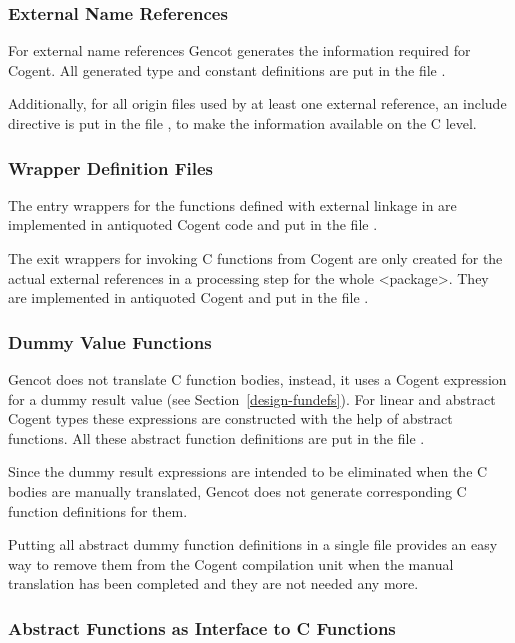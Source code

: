 \subsubsection{External Name References}

For external name references Gencot generates the information required for Cogent. 
All generated type and constant definitions are put in the file .

Additionally, for all origin files used by at least one external reference, an include directive is put in the file
, to make the information available on the C level.

\subsubsection{Wrapper Definition Files}

The entry wrappers for the functions defined with external linkage in  are implemented in antiquoted Cogent code and
put in the file . 

The exit wrappers for invoking C functions from Cogent are only created for the actual
external references in a processing step for the whole <package>. They are implemented in antiquoted Cogent
and put in the file .

\subsubsection{Dummy Value Functions}

Gencot does not translate C function bodies, instead, it uses a Cogent expression for a dummy result value 
(see Section~\ref{design-fundefs}). For linear and abstract Cogent types these expressions are constructed with the
help of abstract functions. All these abstract function definitions are put in the file .

Since the dummy result expressions are intended to be eliminated when the C bodies are manually translated, Gencot 
does not generate corresponding C function definitions for them.

Putting all abstract dummy function definitions in a single file provides an easy way to remove them from the 
Cogent compilation unit when the manual translation has been completed and they are not needed any more.

\subsubsection{Abstract Functions as Interface to C Functions}

